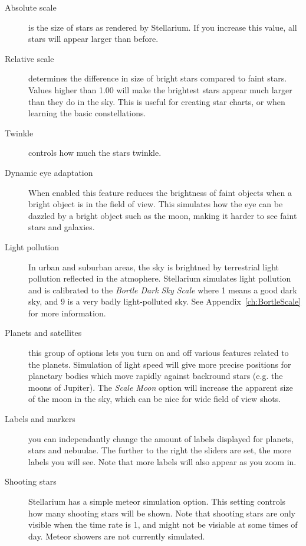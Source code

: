\begin{description}
\item[Absolute scale] is the size of stars as rendered by
  Stellarium. If you increase this value, all stars will appear larger
  than before.
\item[Relative scale] determines the difference in size of bright
  stars compared to faint stars. Values higher than 1.00 will make the
  brightest stars appear much larger than they do in the sky. This is
  useful for creating star charts, or when learning the basic
  constellations.
\item[Twinkle] controls how much the stars twinkle.
\item[Dynamic eye adaptation] When enabled this feature reduces the
  brightness of faint objects when a bright object is in the field of
  view. This simulates how the eye can be dazzled by a bright object
  such as the moon, making it harder to see faint stars and galaxies.
\item[Light pollution] In urban and suburban areas, the sky is
  brightned by terrestrial light pollution reflected in the atmophere.
  Stellarium simulates light pollution and is calibrated to the
  \emph{Bortle Dark Sky Scale} where 1 means a good dark sky, and 9 is
  a very badly light-polluted sky. See Appendix~\ref{ch:BortleScale}
  for more information.
\item[Planets and satellites] this group of options lets you turn on
  and off various features related to the planets. Simulation of light
  speed will give more precise positions for planetary bodies which move
  rapidly against backround stars (e.g. the moons of Jupiter). The
  \emph{Scale Moon} option will increase the apparent size of the moon
  in the sky, which can be nice for wide field of view shots.
\item[Labels and markers] you can independantly change the amount of
  labels displayed for planets, stars and nebuulae. The further to the
  right the sliders are set, the more labels you will see. Note that
  more labels will also appear as you zoom in.
\item[Shooting stars] Stellarium has a simple meteor simulation
  option. This setting controls how many shooting stars will be shown.
  Note that shooting stars are only visible when the time rate is 1, and
  might not be visiable at some times of day. Meteor showers are not
  currently simulated.
\end{description}



